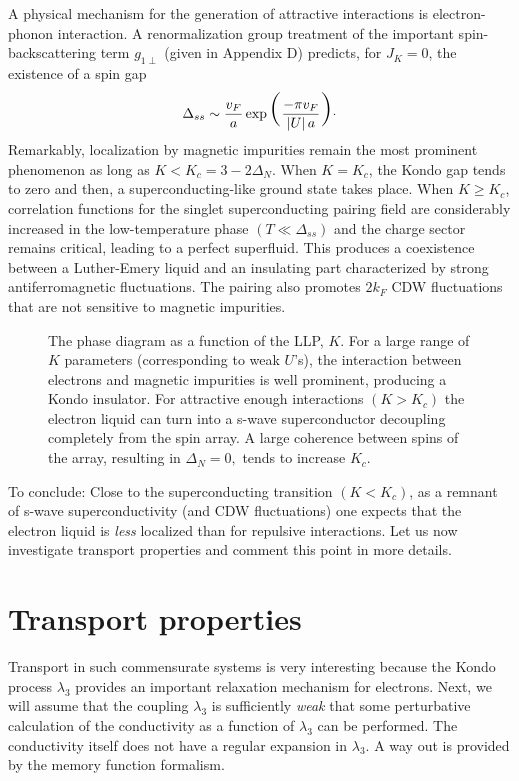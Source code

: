 A physical mechanism for the generation of attractive
interactions is electron-phonon interaction. A renormalization group
treatment of the important spin-backscattering term $g_{1\perp}$ 
(given in Appendix D) predicts, for $J_K=0$, the existence of a
spin gap
\begin{equation}
\Delta_{ss}\sim \frac{v_F}{a}\exp\hbox{\Huge(}\frac{-\pi
  v_F}{\left|U\right|a}\hbox{\Huge)}\cdot
\end{equation}
Remarkably, localization by magnetic impurities remain the most prominent 
phenomenon
as long as $K<K_c=3-2\Delta_N$. When $K=K_c$, the Kondo gap tends to zero
and then, a superconducting-like ground state takes place.
When $K\geq K_c$, correlation functions
for the singlet superconducting pairing field
are considerably increased in the
low-temperature phase $(T\ll\Delta_{ss})$ and the charge sector remains
critical, leading to a perfect superfluid. 
This produces a coexistence between a Luther-Emery liquid and
an insulating part characterized by 
strong antiferromagnetic fluctuations.
The pairing also promotes $2k_F$ CDW
fluctuations that are not sensitive
to magnetic impurities.
\vskip 0.2cm
\begin{figure}
\centerline{}
\vskip 0.3cm
\caption{The phase diagram as a function of the LLP, $K$. For a large range of
$K$ parameters (corresponding to weak $U$'s), 
the interaction between electrons
and magnetic impurities is well prominent, producing a
Kondo insulator. For attractive enough interactions $(K>K_c)$
the electron liquid can turn into a s-wave superconductor 
decoupling completely from the spin array.
A large coherence between spins of the array, resulting
in $\Delta_N=0,$ tends to increase $K_c$.}
\end{figure}
\vskip 0.1cm
To conclude: Close to the superconducting
transition $(K<K_c)$, as a remnant of
s-wave superconductivity (and CDW fluctuations)
one expects
that the electron liquid is {\it less} localized 
than for repulsive interactions.
Let us now investigate transport properties and comment this point
in more details.

\section{Transport properties}

Transport in such commensurate systems is very interesting because the
Kondo process $\lambda_3$ provides an important relaxation mechanism for
electrons. Next, we will assume that the coupling $\lambda_3$
is sufficiently \emph{weak}
 that some perturbative calculation of the conductivity
as a function of $\lambda_3$ can be performed. The conductivity itself
does not have a regular expansion in $\lambda_3$. A way out is provided by
the memory function formalism. 


